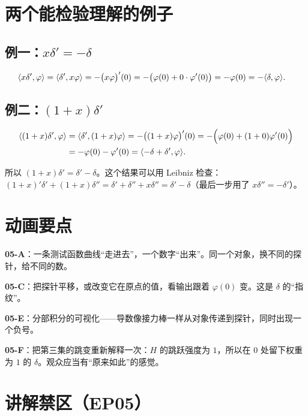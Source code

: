 \section{两个能检验理解的例子}

\subsection{例一：$x\delta'=-\delta$}

\begin{align}
\langle x\delta',\varphi\rangle
&=\langle \delta',x\varphi\rangle=-\big(x\varphi\big)'(0)
=-\big(\varphi(0)+0\cdot\varphi'(0)\big)=-\varphi(0)=-\langle \delta,\varphi\rangle.
\end{align}

\subsection{例二：$(1+x)\delta'$}

\begin{align}
\langle (1+x)\delta',\varphi\rangle
&=\langle \delta',(1+x)\varphi\rangle
=-\big((1+x)\varphi\big)'(0)
=-\Big(\varphi(0)+(1+0)\varphi'(0)\Big)\notag\\
&=-\varphi(0)-\varphi'(0)
=\langle -\delta+\delta',\varphi\rangle.
\end{align}

所以 $(1+x)\delta'=\delta'-\delta$。这个结果可以用 Leibniz 检查：$(1+x)'\delta'+(1+x)\delta''=\delta'+\delta''+x\delta''=\delta'-\delta$（最后一步用了 $x\delta''=-\delta'$）。

\section{动画要点}

\begin{scriptbox}[动画要点 05-A / 05-C / 05-E]
\textbf{05-A}：一条测试函数曲线“走进去”，一个数字“出来”。同一个对象，换不同的探针，给不同的数。

\textbf{05-C}：把探针平移，或改变它在原点的值，看输出跟着 $\varphi(0)$ 变。这是 $\delta$ 的“指纹”。

\textbf{05-E}：分部积分的可视化——导数像接力棒一样从对象传递到探针，同时出现一个负号。

\textbf{05-F}：把第三集的跳变重新解释一次：$H$ 的跳跃强度为 $1$，所以在 $0$ 处留下权重为 $1$ 的 $\delta$。观众应当有“原来如此”的感觉。
\end{scriptbox}

\section{讲解禁区（EP05）}

